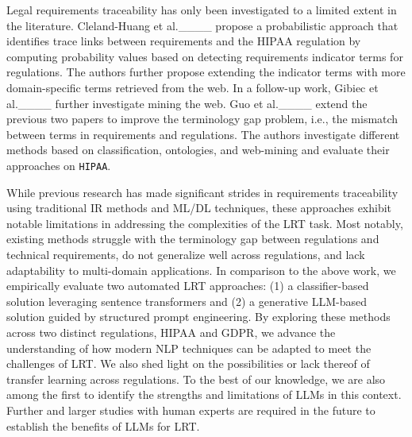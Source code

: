 Legal requirements traceability has only been investigated to a limited extent in the literature. Cleland-Huang et al.____ propose a probabilistic approach that identifies trace links between requirements and the HIPAA regulation by computing probability values based on detecting requirements indicator terms for regulations. The authors further propose extending the indicator terms with more domain-specific terms retrieved from the web. In a follow-up work, Gibiec et al.____ further investigate mining the web. 
%
Guo et al.____ extend the previous two papers to improve the terminology gap problem, i.e., the mismatch between terms in requirements and regulations. The authors investigate different methods based on classification, ontologies, and web-mining and evaluate their approaches on \texttt{HIPAA}. 

While previous research has made significant strides in requirements traceability using traditional IR methods and ML/DL techniques, these approaches exhibit notable limitations in addressing the complexities of the LRT task. Most notably, existing methods struggle with the terminology gap between regulations and technical requirements, do not generalize well across regulations, and lack adaptability to multi-domain applications. In comparison to the above work, we empirically evaluate two automated LRT approaches: (1) a classifier-based solution leveraging sentence transformers and (2) a generative LLM-based solution guided by structured prompt engineering. By exploring these methods across two distinct regulations, HIPAA and GDPR, we advance the understanding of how modern NLP techniques can be adapted to meet the challenges of LRT. We also shed light on the possibilities or lack thereof of transfer learning across regulations. To the best of our knowledge, we are also among the first to identify the strengths and limitations of LLMs in this context. Further and larger studies with human experts are required in the future to establish the benefits of LLMs for LRT. 

